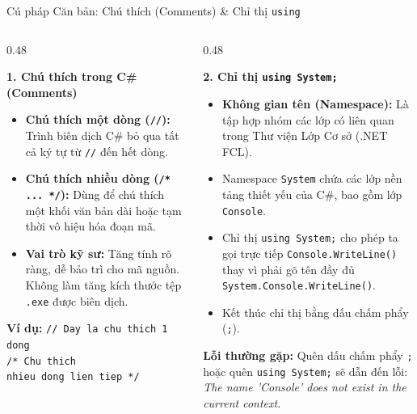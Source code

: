 \documentclass[aspectratio=169, 10pt]{beamer}
\begin{document}
\begin{frame}{Cú pháp Căn bản: Chú thích (Comments) \& Chỉ thị \texttt{using}}
  \begin{columns}[T]
    \begin{column}{0.48\textwidth}
      \begin{block}{\textbf{1. Chú thích trong C\# (Comments)}}
        \begin{itemize}\small
          \item \textbf{Chú thích một dòng (\texttt{//}):} Trình biên dịch C\# bỏ qua tất cả ký tự từ \texttt{//} đến hết dòng.
          \item \textbf{Chú thích nhiều dòng (\texttt{/* ... */}):} Dùng để chú thích một khối văn bản dài hoặc tạm thời vô hiệu hóa đoạn mã.
          \item \textbf{Vai trò kỹ sư:} Tăng tính rõ ràng, dễ bảo trì cho mã nguồn. Không làm tăng kích thước tệp \texttt{.exe} được biên dịch.
        \end{itemize}
      \end{block}
      \begin{exampleblock}{\textbf{Ví dụ:}}
        \texttt{// Day la chu thich 1 dong}\\
        \texttt{/* Chu thich\\
        \hspace*{4mm}nhieu dong lien tiep */}
      \end{exampleblock}
    \end{column}

    \begin{column}{0.48\textwidth}
      \begin{block}{\textbf{2. Chỉ thị \texttt{using System;}}}
        \begin{itemize}\small
          \item \textbf{Không gian tên (Namespace):} Là tập hợp nhóm các lớp có liên quan trong Thư viện Lớp Cơ sở (.NET FCL).
          \item Namespace \texttt{System} chứa các lớp nền tảng thiết yếu của C\#, bao gồm lớp \texttt{Console}.
          \item Chỉ thị \texttt{using System;} cho phép ta gọi trực tiếp \texttt{Console.WriteLine()} thay vì phải gõ tên đầy đủ \texttt{System.Console.WriteLine()}.
          \item Kết thúc chỉ thị bằng dấu chấm phẩy (\texttt{;}).
        \end{itemize}
      \end{block}
      \begin{alertblock}{\textbf{Lỗi thường gặp:}}
        Quên dấu chấm phẩy \texttt{;} hoặc quên \texttt{using System;} sẽ dẫn đến lỗi: \textit{The name 'Console' does not exist in the current context}.
      \end{alertblock}
    \end{column}
  \end{columns}
\end{frame}
\end{document}
